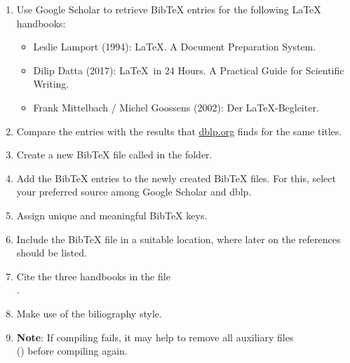 \begin{enumerate}
  \item Use Google Scholar to retrieve Bib\TeX{} entries for the following \LaTeX{}
  handbooks:
  \begin{itemize}
    \item Leslie Lamport (1994): \LaTeX. A Document Preparation System.
    \item Dilip Datta (2017): \LaTeX\ in 24 Hours. A Practical Guide for Scientific Writing.
    \item Frank Mittelbach / Michel Goossens (2002): Der \LaTeX-Begleiter.
  \end{itemize}
  \item Compare the entries with the results that \url{dblp.org} finds for the same titles.
  \item Create a new Bib\TeX{} file called  in the 
   folder.
  \item Add the Bib\TeX{} entries to the newly created Bib\TeX{} files. For this, select your preferred source among Google Scholar and dblp.
  \item Assign unique and meaningful Bib\TeX{} keys.
  \item Include the Bib\TeX{} file in a suitable location, where later on the references should be listed.
  \item Cite the three handbooks in the 
  file\\.
  \item Make use of the  biliography style.
  \item \textbf{Note}: If compiling fails, it may help to remove all auxiliary 
  files \\() before compiling again.
\end{enumerate}

